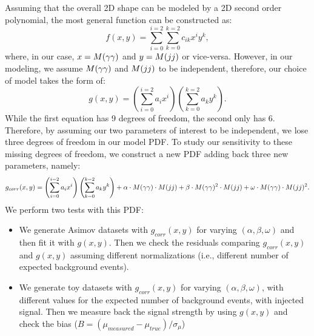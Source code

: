 Assuming that the overall 2D shape can be modeled by a 2D second order polynomial, the most general function can be constructed as:
\begin{equation}
f(x,y) = \sum_{i=0}^{i=2}\sum_{k=0}^{k=2}c_{ik}x^{i}y^{k},
\end{equation}
where, in our case, $x = M(\gamma\gamma)$ and $y = M(jj)$ or vice-versa. 
However, in our modeling, we assume $M(\gamma\gamma)$ and $M(jj)$ to be independent, therefore, our choice of model takes the form of:
\begin{equation}
g(x,y) = \left( \sum_{i=0}^{i=2} a_{i} x^{i}\right)\left( \sum_{k=0}^{k=2} a_{k} y^{k} \right).
\end{equation}
While the first equation has 9 degrees of freedom, the second only has 6. 
Therefore, by assuming our two parameters of interest to be independent, we lose three degrees of freedom in our model PDF. 
To study our sensitivity to these missing degrees of freedom, we construct a new PDF adding back three new parameters, namely:
\begin{equation}
g_{corr}(x,y) = \left( \sum_{i=0}^{i=2} a_{i} x^{i}\right)\left( \sum_{k=0}^{k=2} a_{k} y^{k} \right) + \alpha\cdot M(\gamma\gamma)\cdot M(jj) + \beta\cdot M(\gamma\gamma)^{2}\cdot M(jj)+ \omega\cdot M(\gamma\gamma)\cdot M(jj)^{2}.
\end{equation}
We perform two tests with this PDF: 
\begin{itemize}
\item We generate Asimov datasets with $g_{corr}(x,y)$ for varying $(\alpha,\beta,\omega)$ and then fit it with $g(x,y)$. Then we check the residuals comparing $g_{corr}(x,y)$ and $g(x,y)$ assuming different normalizations (i.e., different number of expected background events).
\item We generate toy datasets with  $g_{corr}(x,y)$ for varying $(\alpha,\beta,\omega)$, with different values for the expected number of background events, with injected signal. Then we measure back the signal strength by using $g(x,y)$ and check the bias ($B = (\mu_{measured} - \mu_{true})/\sigma_{\mu}$)
\end{itemize}

